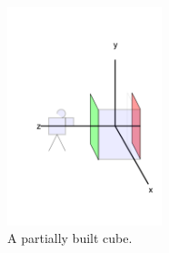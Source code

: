 \documentclass[a4wide]{article}
\begin{document}
\begin{figure}[h]
\begin{center}
\includegraphics[width=0.4\textwidth]{cube_construct.pdf}
\end{center}
\caption{A partially built cube.}
\label{fig-cube}
\end{figure}
\end{document}

